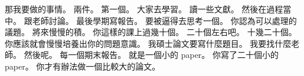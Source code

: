 \hypertarget{w01:cue:110}{}那我要做的事情。
\hypertarget{w01:cue:111}{}兩件。
\hypertarget{w01:cue:112}{}第一個。
\hypertarget{w01:cue:113}{}大家去學習。
\hypertarget{w01:cue:114}{}讀一些文獻。
\hypertarget{w01:cue:115}{}然後在過程當中。
\hypertarget{w01:cue:116}{}跟老師討論。
\hypertarget{w01:cue:117}{}最後學期寫報告。
\hypertarget{w01:cue:118}{}要被逼得去思考一個。
\hypertarget{w01:cue:119}{}你認為可以處理的議題。
\hypertarget{w01:cue:120}{}將來慢慢的積。
\hypertarget{w01:cue:121}{}你這樣的課上過幾十個。
\hypertarget{w01:cue:122}{}二十個左右吧。
\hypertarget{w01:cue:123}{}十幾二十個。
\hypertarget{w01:cue:124}{}你應該就會慢慢培養出你的問題意識。
\hypertarget{w01:cue:125}{}我碩士論文要寫什麼題目。
\hypertarget{w01:cue:126}{}我要找什麼老師。
\hypertarget{w01:cue:127}{}然後呢。
\hypertarget{w01:cue:128}{}每一個期末報告。
\hypertarget{w01:cue:129}{}就是一個小的 paper。
\hypertarget{w01:cue:130}{}你寫了二十個小的 paper。
\hypertarget{w01:cue:131}{}你才有辦法做一個比較大的論文。

